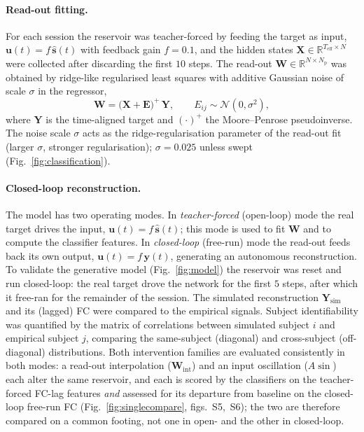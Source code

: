 \documentclass[11pt]{article}
\begin{document}
\paragraph{Read-out fitting.}
For each session the reservoir was teacher-forced by feeding the target as
input, $\mathbf{u}(t)=f\,\hat{\mathbf{s}}(t)$ with feedback gain $f=0.1$, and
the hidden states $\mathbf{X}\in\mathbb{R}^{T_{\mathrm{eff}}\times N}$ were
collected after discarding the first $10$ steps. The read-out
$\mathbf{W}\in\mathbb{R}^{N\times N_{\mathrm{p}}}$ was obtained by
ridge-like regularised least squares with additive Gaussian noise of scale
$\sigma$ in the regressor,
\begin{equation}
\mathbf{W} = \bigl(\mathbf{X}+\mathbf{E}\bigr)^{+}\,\mathbf{Y},
\qquad E_{ij}\sim\mathcal{N}(0,\sigma^{2}),
\end{equation}
where $\mathbf{Y}$ is the time-aligned target and $(\cdot)^{+}$ the
Moore--Penrose pseudoinverse. The noise scale $\sigma$ acts as the
ridge-regularisation parameter of the read-out fit (larger $\sigma$, stronger
regularisation); $\sigma=0.025$ unless swept
(Fig.~\ref{fig:classification}).

\paragraph{Closed-loop reconstruction.}
The model has two operating modes. In \emph{teacher-forced} (open-loop) mode the
real target drives the input, $\mathbf{u}(t)=f\,\hat{\mathbf{s}}(t)$; this mode is
used to fit $\mathbf{W}$ and to compute the classifier features. In
\emph{closed-loop} (free-run) mode the read-out feeds back its own output,
$\mathbf{u}(t)=f\,\mathbf{y}(t)$, generating an autonomous reconstruction. To
validate the generative model (Fig.~\ref{fig:model}) the reservoir was reset and
run closed-loop: the real target drove the network for the first $5$ steps, after
which it free-ran for the remainder of the session. The
simulated reconstruction $\mathbf{Y}_{\mathrm{sim}}$ and its (lagged) FC were
compared to the empirical signals. Subject identifiability was quantified by
the matrix of correlations between simulated subject $i$ and empirical subject
$j$, comparing the same-subject (diagonal) and cross-subject (off-diagonal)
distributions. Both intervention families are evaluated consistently in both
modes: a read-out interpolation ($\mathbf{W}_{\mathrm{int}}$) and an input
oscillation ($A\sin$) each alter the same reservoir, and each is scored by the
classifiers on the teacher-forced FC-lag features \emph{and} assessed for its
departure from baseline on the closed-loop free-run FC
(Fig.~\ref{fig:singlecompare}, figs.~S5,~S6); the two are therefore compared on a
common footing, not one in open- and the other in closed-loop.
\end{document}
